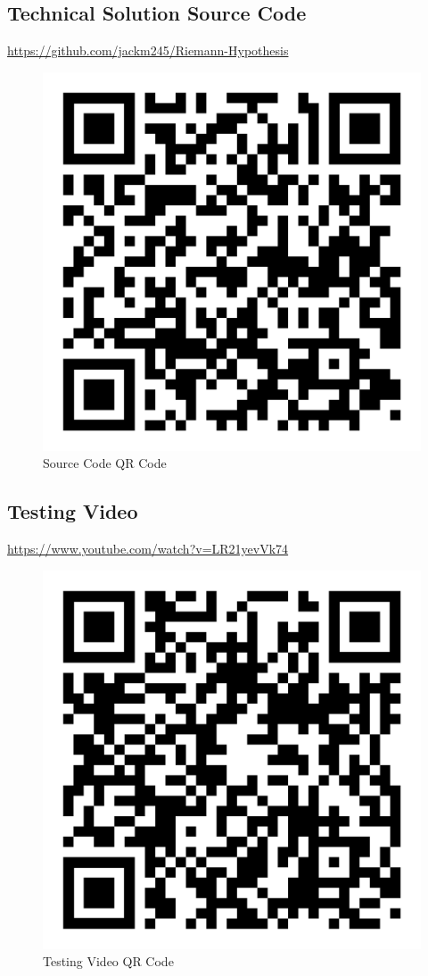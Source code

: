 \documentclass{article}
\begin{document}
\subsection{Technical Solution Source Code}
\url{https://github.com/jackm245/Riemann-Hypothesis}
\begin{figure}[h]
    \centering
    \includegraphics[scale=0.1]{source-code-qr-code}
    \caption{Source Code QR Code}
\end{figure}
\subsection{Testing Video}
\url{https://www.youtube.com/watch?v=LR21yevVk74}
\begin{figure}[h]
    \centering
    \includegraphics[scale=0.1]{testing-video-qr-code}
    \caption{Testing Video QR Code}
\end{figure}
\clearpage
\nocite{*}
\printbibliography
{}
\end{document}
